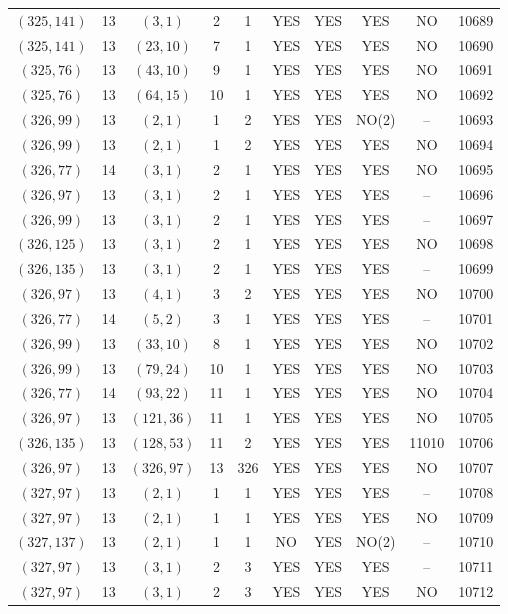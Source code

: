 \begin{longtable}{|c|c|c|c|c|c|c|c|c|c|}
$(325, 141)$ & 13 & $(3, 1)$ & 2 & 1 & YES & YES & YES & NO & 10689\\
$(325, 141)$ & 13 & $(23, 10)$ & 7 & 1 & YES & YES & YES & NO & 10690\\
$(325, 76)$ & 13 & $(43, 10)$ & 9 & 1 & YES & YES & YES & NO & 10691\\
$(325, 76)$ & 13 & $(64, 15)$ & 10 & 1 & YES & YES & YES & NO & 10692\\
$(326, 99)$ & 13 & $(2, 1)$ & 1 & 2 & YES & YES & NO(2) & -- & 10693\\
$(326, 99)$ & 13 & $(2, 1)$ & 1 & 2 & YES & YES & YES & NO & 10694\\
$(326, 77)$ & 14 & $(3, 1)$ & 2 & 1 & YES & YES & YES & NO & 10695\\
$(326, 97)$ & 13 & $(3, 1)$ & 2 & 1 & YES & YES & YES & -- & 10696\\
$(326, 99)$ & 13 & $(3, 1)$ & 2 & 1 & YES & YES & YES & -- & 10697\\
$(326, 125)$ & 13 & $(3, 1)$ & 2 & 1 & YES & YES & YES & NO & 10698\\
$(326, 135)$ & 13 & $(3, 1)$ & 2 & 1 & YES & YES & YES & -- & 10699\\
$(326, 97)$ & 13 & $(4, 1)$ & 3 & 2 & YES & YES & YES & NO & 10700\\
$(326, 77)$ & 14 & $(5, 2)$ & 3 & 1 & YES & YES & YES & -- & 10701\\
$(326, 99)$ & 13 & $(33, 10)$ & 8 & 1 & YES & YES & YES & NO & 10702\\
$(326, 99)$ & 13 & $(79, 24)$ & 10 & 1 & YES & YES & YES & NO & 10703\\
$(326, 77)$ & 14 & $(93, 22)$ & 11 & 1 & YES & YES & YES & NO & 10704\\
$(326, 97)$ & 13 & $(121, 36)$ & 11 & 1 & YES & YES & YES & NO & 10705\\
$(326, 135)$ & 13 & $(128, 53)$ & 11 & 2 & YES & YES & YES & 11010 & 10706\\
$(326, 97)$ & 13 & $(326, 97)$ & 13 & 326 & YES & YES & YES & NO & 10707\\
$(327, 97)$ & 13 & $(2, 1)$ & 1 & 1 & YES & YES & YES & -- & 10708\\
$(327, 97)$ & 13 & $(2, 1)$ & 1 & 1 & YES & YES & YES & NO & 10709\\
$(327, 137)$ & 13 & $(2, 1)$ & 1 & 1 & NO & YES & NO(2) & -- & 10710\\
$(327, 97)$ & 13 & $(3, 1)$ & 2 & 3 & YES & YES & YES & -- & 10711\\
$(327, 97)$ & 13 & $(3, 1)$ & 2 & 3 & YES & YES & YES & NO & 10712\\

\end{longtable}
